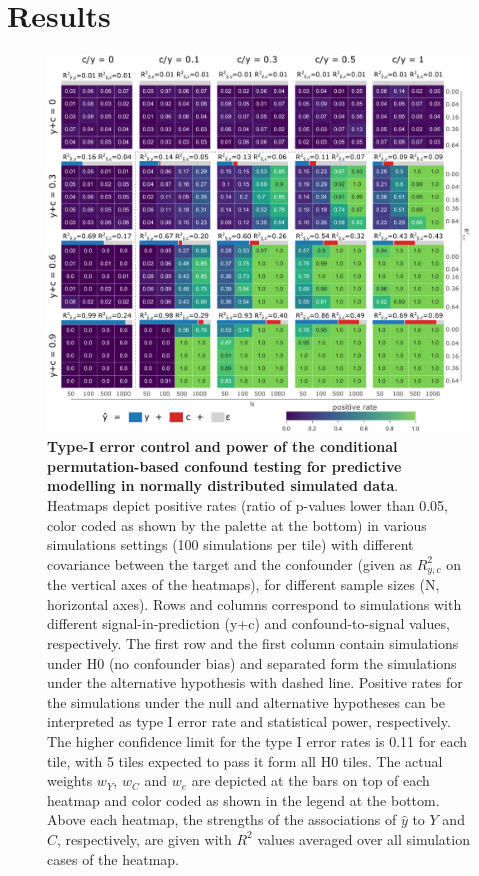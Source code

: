 \documentclass{article}
\begin{document}
\section{Results}

\begin{figure}[!b]
  \centering
  \includegraphics[width=0.75\paperwidth]{fig/sim_normal.eps}
  \caption{\textbf{Type-I error control and power of the conditional permutation-based confound testing for predictive modelling in normally distributed simulated data}. \\
  Heatmaps depict positive rates (ratio of p-values lower than 0.05, color coded as shown by the palette at the bottom) in various simulations settings (100 simulations per tile) with different covariance between the target and the confounder (given as $R^2_{y,c}$ on the vertical axes of the heatmaps), for different sample sizes (N, horizontal axes).
  Rows and columns correspond to simulations with different signal-in-prediction (y+c) and confound-to-signal values, respectively. The first row and the first column contain simulations under H0 (no confounder bias) and separated form the simulations under the alternative hypothesis with dashed line. Positive rates for the simulations under the null and alternative hypotheses can be interpreted as type I error rate and statistical power, respectively. The higher confidence limit for the type I error rates is 0.11 for each tile, with 5 tiles expected to pass it form all H0 tiles.
  The actual weights $w_{Y}$, $w_{C}$ and $w_{e}$ are depicted at the bars on top of each heatmap and color coded as shown in the legend at the bottom. Above each heatmap, the strengths of the associations of $\hat{y}$ to $Y$ and $C$, respectively, are given with $R^2$ values averaged over all simulation cases of the heatmap.
  }
  \label{fig:sim-normal}
\end{figure}
\end{document}
